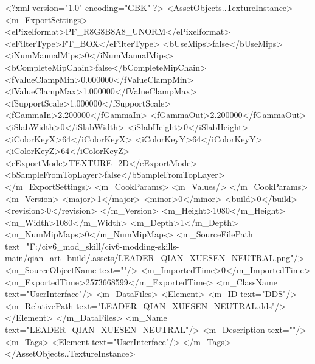 <?xml version="1.0" encoding="GBK" ?>
<AssetObjects..TextureInstance>
	<m_ExportSettings>
		<ePixelformat>PF_R8G8B8A8_UNORM</ePixelformat>
		<eFilterType>FT_BOX</eFilterType>
		<bUseMips>false</bUseMips>
		<iNumManualMips>0</iNumManualMips>
		<bCompleteMipChain>false</bCompleteMipChain>
		<fValueClampMin>0.000000</fValueClampMin>
		<fValueClampMax>1.000000</fValueClampMax>
		<fSupportScale>1.000000</fSupportScale>
		<fGammaIn>2.200000</fGammaIn>
		<fGammaOut>2.200000</fGammaOut>
		<iSlabWidth>0</iSlabWidth>
		<iSlabHeight>0</iSlabHeight>
		<iColorKeyX>64</iColorKeyX>
		<iColorKeyY>64</iColorKeyY>
		<iColorKeyZ>64</iColorKeyZ>
		<eExportMode>TEXTURE_2D</eExportMode>
		<bSampleFromTopLayer>false</bSampleFromTopLayer>
	</m_ExportSettings>
	<m_CookParams>
		<m_Values/>
	</m_CookParams>
	<m_Version>
		<major>1</major>
		<minor>0</minor>
		<build>0</build>
		<revision>0</revision>
	</m_Version>
	<m_Height>1080</m_Height>
	<m_Width>1080</m_Width>
	<m_Depth>1</m_Depth>
	<m_NumMipMaps>0</m_NumMipMaps>
	<m_SourceFilePath text="F:/civ6_mod_skill/civ6-modding-skills-main/qian_art_build/.assets/LEADER_QIAN_XUESEN_NEUTRAL.png"/>
	<m_SourceObjectName text=""/>
	<m_ImportedTime>0</m_ImportedTime>
	<m_ExportedTime>2573668599</m_ExportedTime>
	<m_ClassName text="UserInterface"/>
	<m_DataFiles>
		<Element>
			<m_ID text="DDS"/>
			<m_RelativePath text="LEADER_QIAN_XUESEN_NEUTRAL.dds"/>
		</Element>
	</m_DataFiles>
	<m_Name text="LEADER_QIAN_XUESEN_NEUTRAL"/>
	<m_Description text=""/>
	<m_Tags>
		<Element text="UserInterface"/>
	</m_Tags>
</AssetObjects..TextureInstance>
